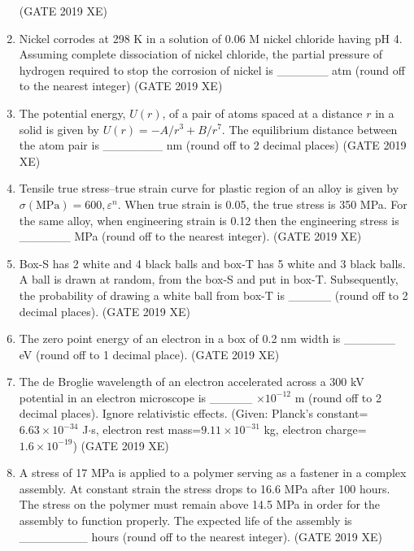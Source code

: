 \documentclass[journal,12pt,onecolumn]{IEEEtran}
\begin{document}
\begin{enumerate}
\hfill{(GATE 2019 XE)} \\


\item Nickel corrodes at 298 K in a solution of 0.06 M nickel chloride having pH 4. Assuming complete dissociation of nickel chloride, the partial pressure of hydrogen required to stop the corrosion of nickel is \_\_\_\_\_\_ atm (round off to the nearest integer)
\hfill{(GATE 2019 XE)} \\


\item The potential energy, $U(r)$, of a pair of atoms spaced at a distance $r$ in a solid is given by $U(r)=-A/r^{3} + B/r^{7}$. The equilibrium distance between the atom pair is \_\_\_\_\_\_\_ nm (round off to 2 decimal places)
\hfill{(GATE 2019 XE)} \\


\item Tensile true stress–true strain curve for plastic region of an alloy is given by $\sigma(\text{MPa})=600,\varepsilon^{n}$. When true strain is 0.05, the true stress is 350 MPa. For the same alloy, when engineering strain is 0.12 then the engineering stress is \_\_\_\_\_\_ MPa (round off to the nearest integer).
\hfill{(GATE 2019 XE)} \\


\item Box-S has 2 white and 4 black balls and box-T has 5 white and 3 black balls. A ball is drawn at random, from the box-S and put in box-T. Subsequently, the probability of drawing a white ball from box-T is \_\_\_\_\_ (round off to 2 decimal places).
\hfill{(GATE 2019 XE)} \\


\item The zero point energy of an electron in a box of 0.2 nm width is \_\_\_\_\_\_ eV (round off to 1 decimal place).
\hfill{(GATE 2019 XE)} \\



\item The de Broglie wavelength of an electron accelerated across a 300 kV potential in an electron microscope is \_\_\_\_\_ $\times10^{-12}$ m (round off to 2 decimal places). Ignore relativistic effects. (Given: Planck's constant=$6.63\times10^{-34}$ J$\cdot$s, electron rest mass=$9.11\times10^{-31}$ kg, electron charge=$1.6\times10^{-19}$)
\hfill{(GATE 2019 XE)} \\


\item A stress of 17 MPa is applied to a polymer serving as a fastener in a complex assembly. At constant strain the stress drops to 16.6 MPa after 100 hours. The stress on the polymer must remain above 14.5 MPa in order for the assembly to function properly. The expected life of the assembly is \_\_\_\_\_\_\_\_ hours (round off to the nearest integer).
\hfill{(GATE 2019 XE)} \\



\end{enumerate}
\end{document}
